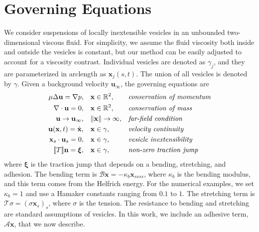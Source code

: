 \documentclass[prf,superscriptaddress,showpacs]{revtex4-1}
\renewcommand{\AA}{\mathcal{A}}
\newcommand{\BB}{\mathcal{B}}
\newcommand{\nn}{\mathbf{n}}
\newcommand{\RR}{\mathbb{R}}
\newcommand{\TT}{\mathcal{T}}
\newcommand{\uu}{\mathbf{u}}
\newcommand{\xx}{\mathbf{x}}
\newcommand{\xxi}{\boldsymbol{\xi}}
\begin{document}
\section{Governing Equations \label{sec:ge}}
We consider suspensions of locally inextensible vesicles in an unbounded
two-dimensional viscous fluid.  For simplicity, we assume the fluid
viscosity both inside and outside the vesicles is constant, but our
method can be easily adjusted to account for a viscosity contrast.
Individual vesicles are denoted as $\gamma_j$, and they are
parameterized in arclength as $\xx_j(s,t)$.  The union of all vesicles
is denoted by $\gamma$.  Given a background velocity $\uu_\infty$, the
governing equations are
\begin{equation*}
\begin{aligned}
  \mu \Delta \uu = \nabla p, \quad &\xx \in \RR^2,
    &&\mbox{\em conservation of momentum} \\
  \nabla \cdot \uu = 0, \quad &\xx \in \RR^2, 
    &&\mbox{\em conservation of mass} \\
  \uu \rightarrow \uu_\infty, \quad &\|\xx\| \rightarrow \infty,
    &&\mbox{\em far-field condition} \\
  \uu(\xx,t) = \dot{\xx}, \quad &\xx \in \gamma,
    &&\mbox{\em velocity continuity} \\
  \xx_s \cdot \uu_s =0, \quad &\xx \in \gamma,
    &&\mbox{\em vesicle inextensibility} \\
  \llbracket T \rrbracket \nn = \xxi, \quad &\xx \in \gamma,
    &&\mbox{\em non-zero traction jump}
\end{aligned}
\end{equation*}
where $\xxi$ is the traction jump that depends on a bending, stretching,
and adhesion.  The bending term is $\BB \xx = -\kappa_b \xx_{ssss}$,
where $\kappa_b$ is the bending modulus, and this term comes from the
Helfrich energy.  For the numerical examples, we set $\kappa_b = 1$ and
use a Hamaker constants ranging from $0.1$ to $1$.  The stretching term
is $\TT \sigma  = (\sigma \xx_s)_s$, where $\sigma$ is the tension.  The
resistance to bending and stretching are standard assumptions of
vesicles.  In this work, we include an adhesive term, $\AA \xx$, that we
now describe.

\end{document}
